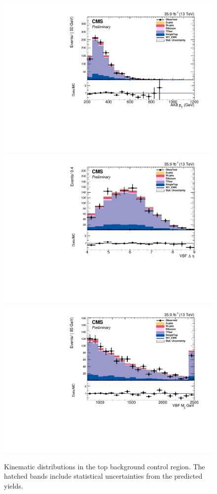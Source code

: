 \begin{figure}[htb]
\includegraphics[width=\cmsFigWidth]{Plots/plots/DibosonBoostedElMuCuts13TeV_TTBarControlRegion_CHS_ungroomed_PuppiAK8_jet_pt.pdf}
\includegraphics[width=\cmsFigWidth]{Plots/plots/DibosonBoostedElMuCuts13TeV_TTBarControlRegion_CHS_vbf_maxpt_jj_Deta.pdf}
\includegraphics[width=\cmsFigWidth]{Plots/plots/DibosonBoostedElMuCuts13TeV_TTBarControlRegion_CHS_vbf_maxpt_jj_m.pdf}
\caption{Kinematic distributions in the top background control region. The hatched bands include statistical uncertainties from the predicted yields.}
\label{fig:top_control}
\end{figure}



